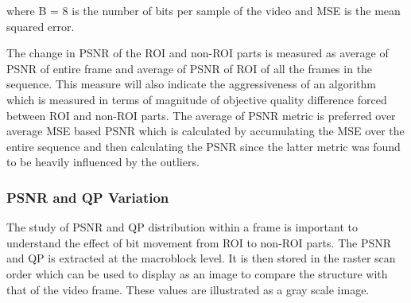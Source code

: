 \documentclass[11pt]{article} %
\begin{document}
where B = 8 is the number of bits per sample of the video and MSE is the mean squared error.

The change in PSNR of the ROI and non-ROI parts is measured as average of PSNR of entire frame and average of PSNR of ROI of all the frames in the sequence. This measure will also indicate the aggressiveness of an algorithm which is measured in terms of magnitude of objective quality difference forced between ROI and non-ROI parts. The average of PSNR metric is preferred over average MSE based PSNR which is calculated by accumulating the MSE over the entire sequence and then calculating the PSNR since the latter metric was found to be heavily influenced by the outliers.
\subsubsection{PSNR and QP Variation}
The study of PSNR and QP distribution within a frame is important to understand the effect of bit movement from ROI to non-ROI parts. The PSNR and QP is extracted at the macroblock level. It is then stored in the raster scan order which can be used to display as  an image to compare the structure with that of the video frame. These values are illustrated as a gray scale image. 
\end{document}
